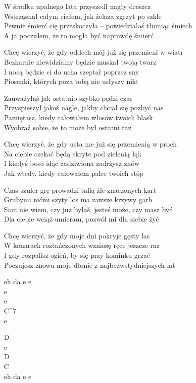 \begin{text}

W środku upalnego lata przyszedł nagły dreszcz\\
Wstrząsnął całym ciałem, jak żelaza zgrzyt po szkle\\
Pewnie śmierć cię przeskoczyła – powiedziałaś tłumiąc śmiech\\
A ja poczułem, że to mogła być naprawdę śmierć

Chcę wierzyć, że gdy oddech mój już się przemieni w wiatr\\
Bezkarnie niewidzialny będzie muskał twoją twarz\\
I nocą będzie ci do ucha szeptał poprzez sny\\
Piosenki, których poza tobą nie usłyszy nikt

Zauważyłaś jak ostatnio szybko pędzi czas\\
Przyspieszył jakoś nagle, jakby chciał się pozbyć nas\\
Pamiętasz, kiedy całowałem włosów twoich blask\\
Wyobraź sobie, że to może był ostatni raz

Chcę wierzyć, że gdy usta me już się przemienią w proch\\
Na ciebie czekać będą skryte pod zielenią łąk\\
I kiedyś boso idąc zadziwiona zadrżysz znów\\
Jak wtedy, kiedy całowałem palce twoich stóp

Czas szuler grę prowadzi talią źle znaczonych kart\\
Grubymi nićmi szyty los ma zawsze krzywy garb\\
Sam nie wiem, czy już byłaś, jesteś może, czy masz być\\
Dla ciebie wciąż umieram, pozwól mi dla siebie żyć

Chcę wierzyć, że gdy moje dni pokryje gęsty las\\
W konarach roztańczonych wzniosę ręce jeszcze raz\\
I gdy rozpalisz ogień, by się przy kominku grzać\\
Poczujesz znowu moje dłonie z najbezwstydniejszych lat
    
\end{text}
\begin{chord}
    \small{
    eh da e e\\
    e\\
    e\\
    C^7\\
    \hfill\break
    e

    D\\
    e\\
    D\\
    C\\
    eh da e e
    }
\end{chord}